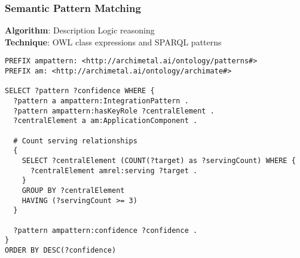 \documentclass[12pt,a4paper]{article}
\begin{document}
\subsubsection{Semantic Pattern Matching}
\textbf{Algorithm}: Description Logic reasoning\\
\textbf{Technique}: OWL class expressions and SPARQL patterns

\begin{lstlisting}[style=sparql,caption=Pattern Discovery Query]
PREFIX ampattern: <http://archimetal.ai/ontology/patterns#>
PREFIX am: <http://archimetal.ai/ontology/archimate#>

SELECT ?pattern ?confidence WHERE {
  ?pattern a ampattern:IntegrationPattern .
  ?pattern ampattern:hasKeyRole ?centralElement .
  ?centralElement a am:ApplicationComponent .

  # Count serving relationships
  {
    SELECT ?centralElement (COUNT(?target) as ?servingCount) WHERE {
      ?centralElement amrel:serving ?target .
    }
    GROUP BY ?centralElement
    HAVING (?servingCount >= 3)
  }

  ?pattern ampattern:confidence ?confidence .
}
ORDER BY DESC(?confidence)
\end{lstlisting}
\end{document}
